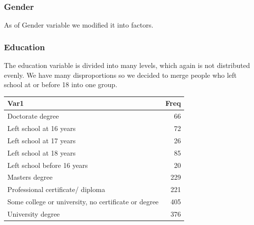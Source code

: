 \documentclass[
]{article}
\newenvironment{Shaded}{\begin{snugshade}}{\end{snugshade}}
\newcommand{\DataTypeTok}[1]{\textcolor[rgb]{0.13,0.29,0.53}{#1}}
\newcommand{\KeywordTok}[1]{\textcolor[rgb]{0.13,0.29,0.53}{\textbf{#1}}}
\newcommand{\NormalTok}[1]{#1}
\newcommand{\OperatorTok}[1]{\textcolor[rgb]{0.81,0.36,0.00}{\textbf{#1}}}
\newcommand{\OtherTok}[1]{\textcolor[rgb]{0.56,0.35,0.01}{#1}}
\newcommand{\StringTok}[1]{\textcolor[rgb]{0.31,0.60,0.02}{#1}}
\begin{document}
\hypertarget{gender}{%
\subsubsection{Gender}\label{gender}}

As of Gender variable we modified it into factors.

\begin{Shaded}
\end{Shaded}

\hypertarget{education}{%
\subsubsection{Education}\label{education}}

The education variable is divided into many levels, which again is not
distributed evenly. We have many disproportions so we decided to merge
people who left school at or before 18 into one group.

\begin{Shaded}
\end{Shaded}

\begin{longtable}[]{@{}lr@{}}
\toprule
Var1 & Freq\tabularnewline
\midrule
\endhead
Doctorate degree & 66\tabularnewline
Left school at 16 years & 72\tabularnewline
Left school at 17 years & 26\tabularnewline
Left school at 18 years & 85\tabularnewline
Left school before 16 years & 20\tabularnewline
Masters degree & 229\tabularnewline
Professional certificate/ diploma & 221\tabularnewline
Some college or university, no certificate or degree &
405\tabularnewline
University degree & 376\tabularnewline
\bottomrule
\end{longtable}
\end{document}
